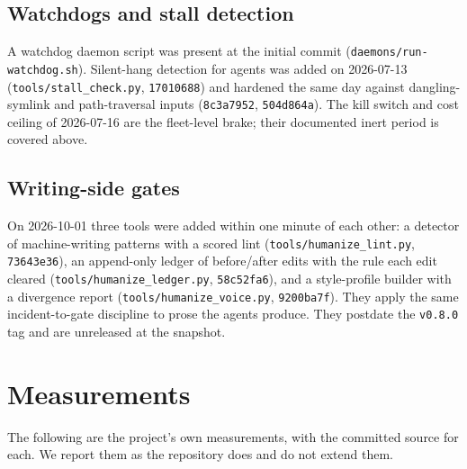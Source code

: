 \documentclass[11pt]{article}
\newcommand{\sha}[1]{\texttt{\small #1}}
\newcommand{\file}[1]{\texttt{\small #1}}
\begin{document}
\subsection{Watchdogs and stall detection}

A watchdog daemon script was present at the initial commit (\file{daemons/run-watchdog.sh}). Silent-hang detection for agents was added on 2026-07-13 (\file{tools/stall\_check.py}, \sha{17010688}) and hardened the same day against dangling-symlink and path-traversal inputs (\sha{8c3a7952}, \sha{504d864a}). The kill switch and cost ceiling of 2026-07-16 are the fleet-level brake; their documented inert period is covered above.

\subsection{Writing-side gates}

On 2026-10-01 three tools were added within one minute of each other: a detector of machine-writing patterns with a scored lint (\file{tools/humanize\_lint.py}, \sha{73643e36}), an append-only ledger of before/after edits with the rule each edit cleared (\file{tools/humanize\_ledger.py}, \sha{58c52fa6}), and a style-profile builder with a divergence report (\file{tools/humanize\_voice.py}, \sha{9200ba7f}). They apply the same incident-to-gate discipline to prose the agents produce. They postdate the \texttt{v0.8.0} tag and are unreleased at the snapshot.

\section{Measurements}
\label{sec:measure}

The following are the project's own measurements, with the committed source for each. We report them as the repository does and do not extend them.
\end{document}
